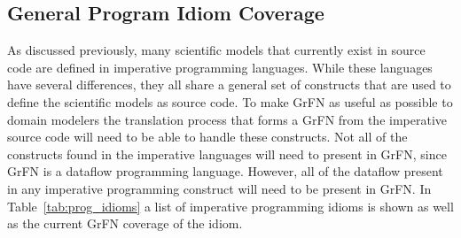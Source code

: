 \subsection{General Program Idiom Coverage\label{sec:supported_program_constructs}}
As discussed previously, many scientific models that currently exist in source code are defined in imperative programming languages.
While these languages have several differences, they all share a general set of constructs that are used to define the scientific models as source code.
To make GrFN as useful as possible to domain modelers the translation process that forms a GrFN from the imperative source code will need to be able to handle these constructs.
Not all of the constructs found in the imperative languages will need to present in GrFN, since GrFN is a dataflow programming language.
However, all of the dataflow present in any imperative programming construct will need to be present in GrFN.
In Table~\ref{tab:prog_idioms} a list of imperative programming idioms is shown as well as the current GrFN coverage of the idiom.

